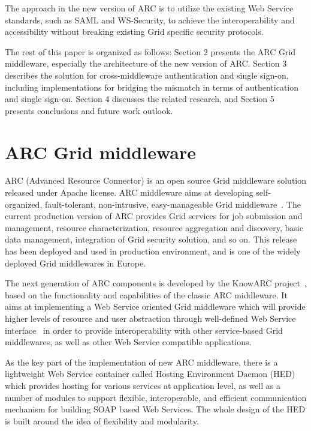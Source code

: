 \documentclass[twocolumn]{svjour3}         %
\begin{document}
The approach in the new version of ARC is to utilize the existing Web Service standards, such as SAML and WS-Security, to achieve the interoperability and accessibility without breaking existing Grid specific security protocols.

The rest of this paper is organized as follows: Section 2 presents the ARC Grid middleware, especially the architecture of the new version of ARC. Section 3 describes the solution for cross-middleware authentication and single sign-on, including implementations for bridging the mismatch in terms of authentication and single sign-on. Section 4 discusses the related research, and Section 5 presents conclusions and future work outlook.

\section{ARC Grid middleware}
\label{sec:arcmiddleware}
ARC (Advanced Resource Connector) is an open source Grid middleware solution released under Apache license. ARC middleware aims at developing self-organized, fault-tolerant, non-intrusive, easy-manageable Grid middleware~\cite{MEllert07}. The current production version of ARC provides Grid services for job submission and management, resource characterization, resource aggregation and discovery, basic data management, integration of Grid security solution, and so on. This release has been deployed and used in production environment, and is one of the widely deployed Grid middlewares in Europe.

The next generation of ARC components is developed by the KnowARC project~\cite{KnowARClink}, based on the functionality and capabilities of the classic ARC middleware. It aims at implementing a Web Service oriented Grid middleware which will provide higher levels of resource and user abstraction through well-defined Web Service interface~\cite{KnowARCDesignlink} in order to provide interoperability with other service-based Grid middlewares, as well as other Web Service compatible applications.

As the key part of the implementation of new ARC middleware, there is a lightweight Web Service container called Hosting Environment Daemon (HED) which provides hosting for various services at application level, as well as a number of modules to support flexible, interoperable, and efficient communication mechanism for building SOAP based Web Services. The whole design of the HED is built around the idea of flexibility and modularity.
\end{document}
